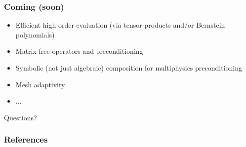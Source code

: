 \documentclass[presentation]{beamer}
\begin{document}
\begin{frame}
  \frametitle{Coming (soon)}
  \begin{itemize}
  \item Efficient high order evaluation (via tensor-products and/or
    Bernstein polynomials)
  \item Matrix-free operators and preconditioning
  \item Symbolic (not just algebraic) composition for multiphysics
    preconditioning
  \item Mesh adaptivity
  \item ...
  \end{itemize}
\end{frame}

\begin{frame}[standout]
  Questions?
\end{frame}

\appendix
\begin{frame}[allowframebreaks]
  \frametitle{References}
  \printbibliography[heading=none]
\end{frame}
\end{document}
